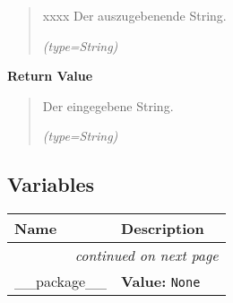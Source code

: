 \begin{boxedminipage}{\funcwidth}
\begin{quote}
\begin{Ventry}{xxxx}
          Der auszugebenende String.

            {\it (type=String)}

        \end{Ventry}

      \end{quote}

      \textbf{Return Value}
    \vspace{-1ex}

      \begin{quote}
      Der eingegebene String.

      {\it (type=String)}

      \end{quote}

    \end{boxedminipage}



  \subsection{Variables}

    \vspace{-1cm}
\hspace{\varindent}\begin{longtable}{|p{\varnamewidth}|p{\vardescrwidth}|l}
\cline{1-2}
\cline{1-2} \centering \textbf{Name} & \centering \textbf{Description}& \\
\cline{1-2}
\endhead\cline{1-2}\multicolumn{3}{r}{\small\textit{continued on next page}}\\\endfoot\cline{1-2}
\endlastfoot\raggedright \_\-\_\-p\-a\-c\-k\-a\-g\-e\-\_\-\_\- & \raggedright \textbf{Value:} 
{\tt None}&\\
\cline{1-2}
\end{longtable}


